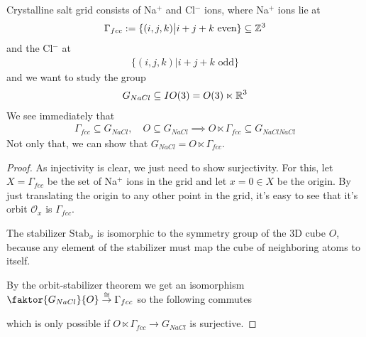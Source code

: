 \begin{ex}[]
Crystalline salt grid consists of Na$^{+}$ and Cl$^{-}$ ions, where Na$^{+}$ ions lie at
\begin{align*}
  \Gamma_{fcc} := \{(i,j,k) \big\vert i + j + k \text{ even}\} \subseteq \mathbb{Z}^{3}
\end{align*}
and the Cl$^{-}$ at
\begin{align*}
  \{(i,j,k) \big\vert i + j + k \text{ odd}\}
\end{align*}
and we want to study the group
\begin{align*}
  G_{NaCl} \subseteq IO(3) = O(3) \ltimes \mathbb{R}^{3}
\end{align*}
We see immediately that
\begin{align*}
  \Gamma_{fcc} \subseteq G_{NaCl}, \quad O \subseteq G_{NaCl} \implies O \ltimes \Gamma_{fcc} \subseteq G_{NaClNaCl}
\end{align*}
Not only that, we can show that $G_{NaCl} = O \ltimes \Gamma_{fcc}$.
\end{ex}
\begin{proof}
As injectivity is clear, we just need to show surjectivity. For this, let $X= \Gamma_{fcc}$ be the set of Na$^{+}$ ions in the grid and let $x = 0 \in X$ be the origin.
By just translating the origin to any other point in the grid, it's easy to see that it's orbit $\mathcal{O}_x$ is $\Gamma_{fcc}$.

The stabilizer $\text{Stab}_x$ is isomorphic to the symmetry group of the 3D cube $O$, because any element of the stabilizer must map the cube of neighboring atoms to itself.

By the orbit-stabilizer theorem we get an isomorphism $\faktor{G_{NaCl}}{O} \stackrel{\iso}{\to} \Gamma_{fcc}$ so the following commutes
\begin{center}
\end{center}
which is only possible if $O \ltimes \Gamma_{fcc} \to G_{NaCl}$ is surjective.
\end{proof}





